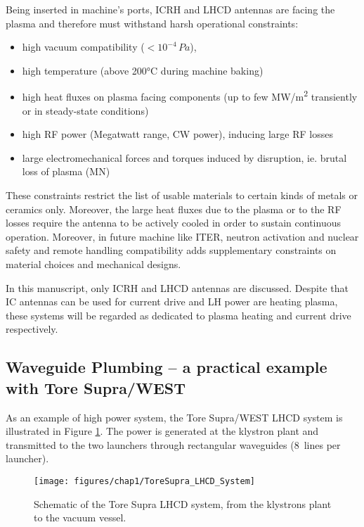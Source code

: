Being inserted in machine's ports, ICRH and LHCD antennas are facing the plasma and therefore must  withstand harsh operational constraints: 
\begin{itemize}
	\item high vacuum compatibility ($<10^{-4}\,\si{Pa}$), 
	\item high temperature (above 200°C during machine baking)
	\item high heat fluxes on plasma facing components (up to few \si{MW/m^2} transiently or in steady-state conditions)
	\item high RF power (Megatwatt range, CW power), inducing large RF losses
	\item large electromechanical forces and torques induced by disruption, ie. brutal loss of plasma (\si{MN})
\end{itemize}
These constraints restrict the list of usable materials to certain kinds of metals or ceramics only. Moreover, the large heat fluxes due to the plasma or to the RF losses require the antenna to be actively cooled in order to sustain continuous operation. Moreover, in future machine like ITER, neutron activation and nuclear safety and remote handling compatibility adds supplementary constraints on material choices and mechanical designs.

In this manuscript, only ICRH and LHCD antennas are discussed. Despite that IC antennas can be used for current drive and LH power are heating plasma, these systems will be regarded as dedicated to plasma heating and current drive respectively. %


\subsection{Waveguide Plumbing – a practical example with Tore Supra/WEST}
As an example of high power system, the Tore Supra/WEST LHCD system is illustrated in Figure \ref{fig:toresupralhcdsystem}. The power is generated at the klystron plant and transmitted to the two launchers through rectangular waveguides (8~lines per launcher). 

\begin{figure}
	\centering
	\texttt{[image: figures/chap1/ToreSupra\_LHCD\_System]}
	\caption{Schematic of the Tore Supra LHCD system, from the klystrons plant to the vacuum vessel.}
	\label{fig:toresupralhcdsystem}
\end{figure}

